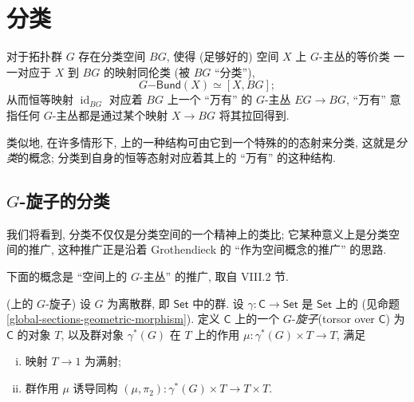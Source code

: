 \chapter{分类\topos{}}


对于拓扑群 $G$ 存在分类空间 $BG$,
使得 (足够好的) 空间 $X$ 上 $G$-主丛的等价类
一一对应于 $X$ 到 $BG$ 的映射同伦类 (被 $BG$ ``分类''),
$$
G\mathsf{-Bund} (X) \simeq [X,BG];
$$
从而恒等映射 $\operatorname{id}_{BG}$ 对应着 $BG$ 上一个 ``万有'' 的 $G$-主丛 $EG \to BG$,
``万有'' 意指任何 $G$-主丛都是通过某个映射 $X \to BG$ 将其拉回得到.

类似地, 在许多情形下, \topos{}上的一种结构可由它到一个特殊的\topos{}的态射来分类, 这就是\emph{分类\topos{}}的概念;
分类\topos{}到自身的恒等态射对应着其上的 ``万有'' 的这种结构.

\section{$G$-旋子的分类\topos{}}

我们将看到, 分类\topos{}不仅仅是分类空间的一个精神上的类比; 它某种意义上是分类空间的推广, 这种推广正是沿着 Grothendieck 的 ``\topos{}作为空间概念的推广'' 的思路.

下面的概念是 ``空间上的 $G$-主丛'' 的推广, 取自 \cite{SGL} VIII.2 节.
\begin{definition}
	[label={G-torsors-over-topos}]
	{(\topos{}上的 $G$-旋子)}
	设 $G$ 为离散群, 即 $\mathsf {Set}$ 中的群.
	设 $\gamma\colon \mathsf C\to \mathsf {Set}$ 是 $\mathsf {Set}$ 上的\topos{} (见命题 \ref{global-sections-geometric-morphism}). 定义 $\mathsf C$ 上的一个 $G$-\emph{旋子}\footnotemark (torsor over $\mathsf C$) 为 $\mathsf C$ 的对象 $T$, 以及群对象 $\gamma^*(G)$ 在 $T$ 上的作用 $\mu\colon \gamma^*(G)\times T \to T$, 满足
	\begin{enumerate}[(i)]
		\item 映射 $T\to 1$ 为满射;
		\item 群作用 $\mu$ 诱导同构 $(\mu,\pi_2)\colon \gamma^*(G)\times T \to T\times T$.
	\end{enumerate}
\end{definition}

